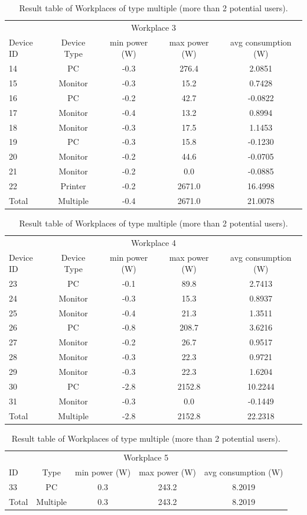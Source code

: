 \begin{table}[h]
	\centering
		\begin{tabular}{l|c|c|c|c}
		\multicolumn{5}{c}{Workplace 3} \\
		Device ID & Device Type & min power (W)& max power (W)& avg consumption (W)\\
		14 & PC & -0.3 & 276.4 & 2.0851 \\
		15 & Monitor & -0.3 & 15.2 & 0.7428 \\
		16 & PC & -0.2 & 42.7 & -0.0822 \\
		17 & Monitor & -0.4 & 13.2 & 0.8994 \\
		18 & Monitor & -0.3 & 17.5 & 1.1453 \\
		19 & PC & -0.3 & 15.8 & -0.1230 \\
		20 & Monitor & -0.2 & 44.6 & -0.0705 \\
		21 & Monitor & -0.2 & 0.0 & -0.0885 \\
		22 & Printer & -0.2 & 2671.0 & 16.4998 \\
		\hline
		Total & Multiple & -0.4 & 2671.0 & 21.0078
	\end{tabular}
	\begin{tabular}{l|c|c|c|c}
		\multicolumn{5}{c}{Workplace 4} \\
		Device ID & Device Type & min power (W)& max power (W)& avg consumption (W)\\
		23 & PC &-0.1 & 89.8 & 2.7413 \\
		24 & Monitor & -0.3 & 15.3 & 0.8937 \\
		25 & Monitor & -0.4 & 21.3 & 1.3511 \\
		26 & PC & -0.8 & 208.7 & 3.6216 \\
		27 & Monitor & -0.2 & 26.7 & 0.9517 \\
		28 & Monitor & -0.3 & 22.3 & 0.9721 \\
		29 & Monitor & -0.3 & 22.3 & 1.6204 \\
		30 & PC & -2.8 & 2152.8 & 10.2244 \\
		31 & Monitor & -0.3 & 0.0 & -0.1449 \\
		\hline
		Total & Multiple & -2.8 & 2152.8 & 22.2318
	\end{tabular} 
	\begin{tabular}{l|c|c|c|c}
		\multicolumn{5}{c}{Workplace 5} \\
		ID & Type & min power (W)& max power (W)& avg consumption (W)\\
		33 & PC & 0.3 & 243.2 & 8.2019 \\
		\hline
		Total& Multiple & 0.3 & 243.2 & 8.2019 \\
	\end{tabular}
	\caption{Result table of Workplaces of type multiple (more than 2 potential users).}
	\label{tab:multi_wp}
\end{table}
